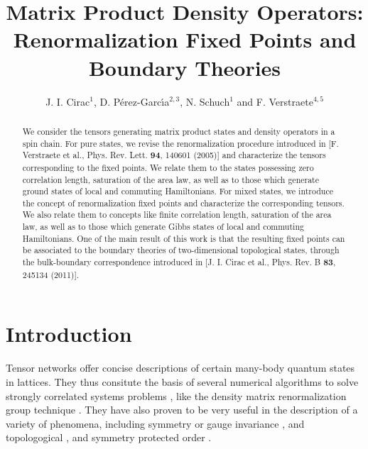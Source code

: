 \documentclass{elsarticle}
\begin{document}
\title{Matrix Product Density Operators: Renormalization Fixed Points and Boundary Theories}

\author{J. I. {Cirac}$^1$, D. {P\'erez-Garc\'{\i}a}$^{2,3}$, N. {Schuch}$^1$ and F. {Verstraete}$^{4,5}$}
\address{$^1$ Max-Planck-Institut f{\"{u}}r Quantenoptik,
Hans-Kopfermann-Str.\ 1, D-85748 Garching, Germany}
\address{$^2$ Departamento de An\'alisis Matem\'atico, Universidad Complutense de Madrid, Plaza de Ciencias 3,
28040 Madrid, Spain}
\address{$^3$ ICMAT, Nicolas Cabrera, Campus de Cantoblanco, 28049 Madrid, Spain}
\address{$^4$ Department of Physics and Astronomy, Ghent University}
\address{$^5$ Vienna Center for Quantum Technology, University of Vienna}


\begin{abstract}
We consider the tensors generating matrix product states and density operators  in a spin chain. For pure states, we revise the renormalization procedure introduced in [F. Verstraete et al., Phys. Rev. Lett. {\bf 94}, 140601 (2005)] and characterize the tensors corresponding to the fixed points. We relate them to the states possessing zero correlation length, saturation of the area law, as well as to those which generate ground states of local and commuting Hamiltonians. For mixed states, we introduce the concept of renormalization fixed points and characterize the corresponding tensors. We also relate them to concepts like finite correlation length, saturation of the area law, as well as to those which generate Gibbs states of local and commuting Hamiltonians. One of the main result of this work is that the resulting fixed points can be associated to the boundary theories of two-dimensional topological states, through the bulk-boundary correspondence introduced in [J. I. Cirac et al., Phys. Rev. B {\bf 83}, 245134 (2011)].
\end{abstract}


\maketitle

\section{Introduction}

Tensor networks offer concise descriptions of certain many-body
quantum states in lattices. They thus consitute the basis of several numerical
algorithms to solve strongly correlated systems problems \cite{Valentin,CiracVerstraete},
like the density
matrix renormalization group technique \cite{DMRG,Schollwock}. They have also proven to
be very useful in the description of a variety of phenomena,
including symmetry \cite{Sanz} or gauge invariance \cite{Tagglia,Jutho},
and topologogical \cite{Norberttopo,Franktopo}, and symmetry protected order
\cite{GuWen}.
\end{document}
